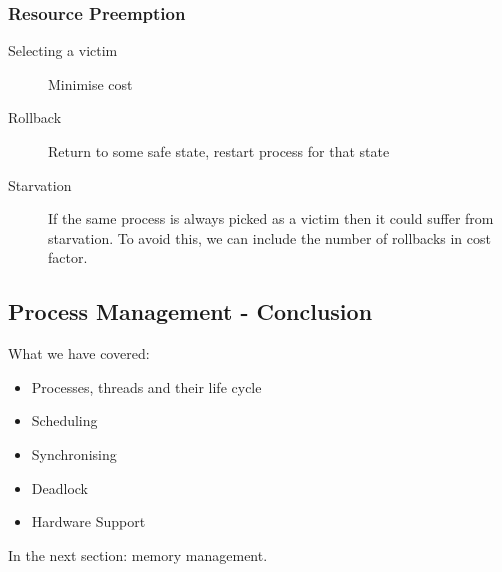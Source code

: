 \documentclass{article}%
\begin{document}
\subsubsection{Resource Preemption}
\label{sec:orgee2757c}
\begin{description}
\item[{Selecting a victim}] Minimise cost
\item[{Rollback}] Return to some safe state, restart process for that state
\item[{Starvation}] If the same process is always picked as a victim then it could suffer from starvation. To avoid this, we can include the number of rollbacks in cost factor.
\end{description}



\subsection{Process Management - Conclusion}
\label{sec:org8fdf03f}
What we have covered:
\begin{itemize}
\item Processes, threads and their life cycle
\item Scheduling
\item Synchronising
\item Deadlock
\item Hardware Support
\end{itemize}
In the next section: memory management.
\end{document}
